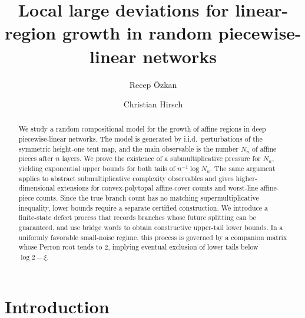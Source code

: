 \documentclass[11pt]{amsart}
\numberwithin{equation}{section}
\theoremstyle{plain}
\theoremstyle{definition}
\theoremstyle{remark}
\begin{document}


\renewcommand{\baselinestretch}{1.05}

\title[Large deviations for linear regions]
{Local large deviations for linear-region growth in random piecewise-linear networks}

\author{Recep {\"O}zkan}
\address{Middle East Technical University, Ankara, Turkey}

\author{Christian Hirsch}
\address{Department of Mathematics, Aarhus University, Aarhus, Denmark}



\begin{abstract}
We study a random compositional model for the growth of affine regions in deep
piecewise-linear networks. The model is generated by i.i.d.\ perturbations of the
symmetric height-one tent map, and the main observable is the number \(N_n\) of
affine pieces after \(n\) layers. We prove the existence of a submultiplicative
pressure for \(N_n\), yielding exponential upper bounds for both tails of
\(n^{-1}\log N_n\). The same argument applies to abstract submultiplicative
complexity observables and gives higher-dimensional extensions for
convex-polytopal affine-cover counts and worst-line affine-piece counts. Since
the true branch count has no matching supermultiplicative inequality, lower
bounds require a separate certified construction. We introduce a finite-state
defect process that records branches whose future splitting can be guaranteed,
and use bridge words to obtain constructive upper-tail lower bounds. In a
uniformly favorable small-noise regime, this process is governed by a companion
matrix whose Perron root tends to \(2\), implying eventual exclusion of lower
tails below \(\log 2-\xi\).
\end{abstract}

\maketitle

\section{Introduction}\label{sec:intro}
\end{document}
